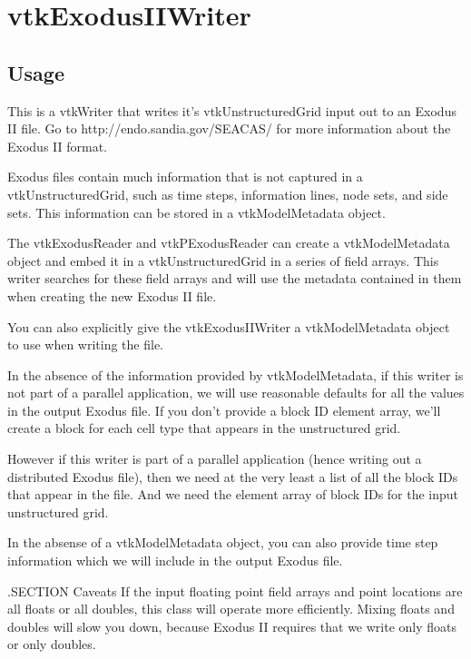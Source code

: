 \section{vtkExodusIIWriter}

\subsection{Usage}

     This is a vtkWriter that writes it's vtkUnstructuredGrid 
     input out to an Exodus II file.  Go to http://endo.sandia.gov/SEACAS/
     for more information about the Exodus II format.

     Exodus files contain much information that is not captured
     in a vtkUnstructuredGrid, such as time steps, information
     lines, node sets, and side sets.  This information can be
     stored in a vtkModelMetadata object.

     The vtkExodusReader and vtkPExodusReader can create
     a vtkModelMetadata object and embed it in a vtkUnstructuredGrid
     in a series of field arrays.  This writer searches for these
     field arrays and will use the metadata contained in them
     when creating the new Exodus II file. 

     You can also explicitly give the vtkExodusIIWriter a
     vtkModelMetadata object to use when writing the file.

     In the absence of the information provided by vtkModelMetadata,
     if this writer is not part of a parallel application, we will use
     reasonable defaults for all the values in the output Exodus file.
     If you don't provide a block ID element array, we'll create a
     block for each cell type that appears in the unstructured grid.

     However if this writer is part of a parallel application (hence 
     writing out a distributed Exodus file), then we need at the very 
     least a list of all the block IDs that appear in the file.  And 
     we need the element array of block IDs for the input unstructured grid.

     In the absense of a vtkModelMetadata object, you can also provide
     time step information which we will include in the output Exodus
     file.

  .SECTION Caveats
     If the input floating point field arrays and point locations are all
     floats or all doubles, this class will operate more efficiently.
     Mixing floats and doubles will slow you down, because Exodus II
     requires that we write only floats or only doubles.

